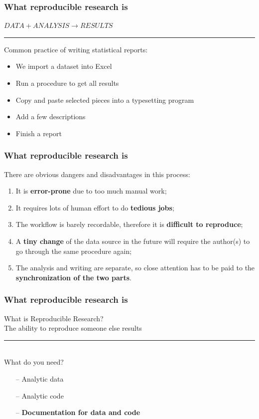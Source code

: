 \documentclass{beamer}
\begin{document}

\begin{frame}
\frametitle{What reproducible research is}
\Large\centering $DATA +  ANALYSIS \rightarrow RESULTS$\\
\rule{\textwidth}{0.05pt}\vspace{20px}
Common practice of writing statistical reports: 
\small\begin{itemize}
    \item We import a dataset into Excel
    \item Run a procedure to get all results
    \item Copy and paste selected pieces into a typesetting program
    \item Add a few descriptions
    \item Finish a report
\end{itemize}

\end{frame}

\begin{frame}
\frametitle{What reproducible research is}

\Large There are obvious dangers and disadvantages in this process:
\small\begin{enumerate}
	\item It is \textbf{error-prone} due to too much manual work;
	\item It requires lots of human effort to do \textbf{tedious jobs}; 
	\item The workflow is barely recordable, therefore it is \textbf{difficult to reproduce};
	\item A \textbf{tiny change} of the data source in the future will require the author(s) to go through the same procedure again;
	\item The analysis and writing are separate, so close attention has to be paid to the \textbf{synchronization of the two parts}.
\end{enumerate}
\end{frame}


\begin{frame}
\frametitle{What reproducible research is}
\Large \centering What is Reproducible Research?\\ 
{\sc The ability to reproduce someone else results}\\
\rule{\textwidth}{0.1pt}\\
\Large \centering What do you need?\\ 
\begin{itemize}
\item[--] Analytic data 
\item[--] Analytic code
\item[--] {\bf Documentation for data and code} 
\end{itemize}
\end{frame}
\end{document}
